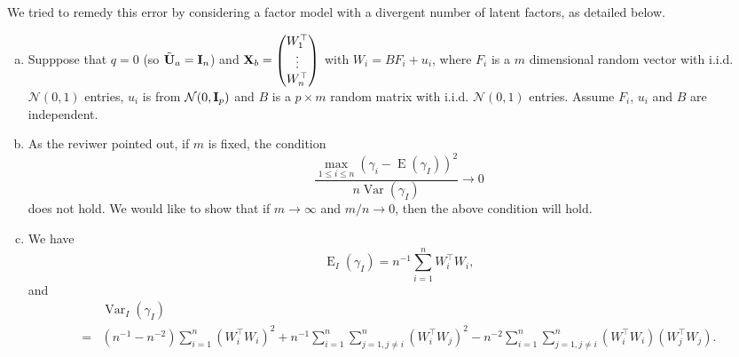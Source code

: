 \documentclass[11pt]{article}
\DeclareMathOperator{\myE}{E}
\DeclareMathOperator{\myVar}{Var}
\theoremstyle{plain}
\theoremstyle{definition}
\theoremstyle{remark}
\begin{document}
We tried to remedy this error by considering a factor model with a divergent number of latent factors, as detailed below.
    \begin{enumerate}[(a)]
        \item 
            Supppose that $q=0$ (so $\tilde {\mathbf{U}}_a = \mathbf{I}_n$) and $\mathbf{X}_b= \begin{pmatrix} W_1^\top \\ \vdots \\ W_n^\top \end{pmatrix}$ with $W_i = B F_i + u_i$, where $F_i$ is a $m$ dimensional random vector with i.i.d. $\mathcal N(0,1)$ entries, $u_i$ is from $\mathcal N(0, \mathbf{I}_p)$ and $B$ is a $p \times m$ random matrix with i.i.d. $\mathcal N (0, 1)$ entries.
            Assume $F_i$, $u_i$ and $B$ are independent.
        \item
            As the reviwer pointed out, if $m$ is fixed, the condition 
            \begin{equation*}
                \frac{\max_{1\leq i \leq n }(\gamma_i -\myE(\gamma_I))^2}{n\myVar(\gamma_I)} \to 0 
            \end{equation*}
            does not hold.
            We would like to show that if $m \to \infty$ and $m / n \to 0$, then the above condition will hold.
        \item
        We have
        \begin{equation*}
            \myE_I(\gamma_I)  = n^{-1} \sum_{i=1}^n W_i^\top W_i,
        \end{equation*}
        and 
        \begin{align*}
            &\myVar_I(\gamma_I)  
            \\
            =& (n^{-1} - n^{-2} )\sum_{i=1}^n (W_i^\top W_i)^2 + n^{-1} \sum_{i=1}^n \sum_{j=1,j\neq i}^n (W_i^\top W_j)^2- n^{-2}\sum_{i=1}^n \sum_{j=1,j\neq i}^n (W_i^\top W_i)(W_j^\top W_j).
        \end{align*}


\end{enumerate}
\end{document}
